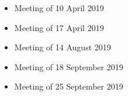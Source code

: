 \documentclass[../main/main.tex]{subfiles}
\begin{document}
\begin{itemize}
\item Meeting of 10 April 2019
\item Meeting of 17 April 2019
\item Meeting of 14 August 2019
\item Meeting of 18 September 2019
\item Meeting of 25 September 2019
\end{itemize}
\end{document}
